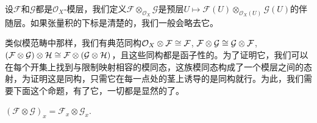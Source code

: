 
\begin{para}
设$\mathcal{F}$和$\mathcal{G}$都是$\mathcal{O}_X$-模层，我们定义$\mathcal{F}\otimes_{\mathcal{O}_X}\mathcal{G}$是预层$U\mapsto \mathcal{F}(U)\otimes_{\mathcal{O}_X(U)}\mathcal{G}(U)$的伴随层。如果张量积的下标是清楚的，我们一般会略去它。

类似模范畴中那样，我们有典范同构$\mathcal{O}_X\otimes \mathcal{F}\cong \mathcal{F}$, $\mathcal{F}\otimes \mathcal{G}\cong \mathcal{G}\otimes \mathcal{F}$, $(\mathcal{F}\otimes \mathcal{G}) \otimes \mathcal{H}\cong \mathcal{F}\otimes (\mathcal{G} \otimes \mathcal{H})$，且这些同构都是函子性的。为了证明它，我们可以在每个开集上找到与限制映射相容的模同态，这族模同态构成了一个模层之间的态射，为证明这是同构，只需它在每一点处的茎上诱导的是同构就行。为此，我们需要下面这个命题，有了它，一切都是显然的了。
\end{para}

\begin{pro}
$(\mathcal{F}\otimes\mathcal{G})_x=\mathcal{F}_x\otimes\mathcal{G}_x$.
\end{pro}

